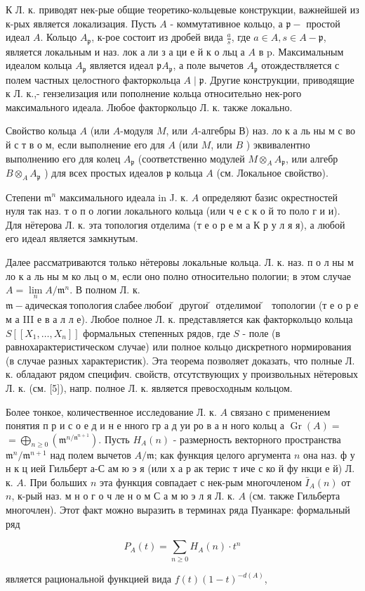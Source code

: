 \documentclass[10pt]{article}
\begin{document}
К Л. к. приводят нек-рые общие теоретико-кольцевые конструкции, важнейшей из к-рых является локализация. Пусть $A$ - коммутативное кольцо, а $\mathfrak{p}-$ простой идеал $A$. Кольцо $A_{\mathfrak{p}}$, к-рое состоит из дробей вида $\frac{a}{s}$, где $a \in A, s \in A-\mathfrak{p}$, является локальным и наз. лок а ли з а ци е й к о льц а $A$ в p. Максимальным идеалом кольца $A_{\mathfrak{p}}$ является идеал $\mathfrak{p} A_{\mathfrak{p}}$, а поле вычетов $A_{\mathfrak{p}}$ отождествляется с полем частных целостного факторкольца $A \mid \mathfrak{p}$. Другие конструкции, приводящие к Л. к.,- гензелизация или пополнение кольца относительно нек-рого максимального идеала. Любое факторкольцо Л. к. также локально.



Свойство кольца $A$ (или $A$-модуля $M$, или $A$-алгебры В) наз. ло к а ль ны м с во й с т в о м, если выполнение его для $A$ (или $M$, или $B$ ) эквивалентно выполнению его для колец $A_{\mathfrak{p}}$ (соответственно модулей $M \otimes_{A} A_{\mathfrak{p}}$, или алгебр $B \otimes_{A} A_{\mathfrak{p}}$ ) для всех простых идеалов $\mathfrak{p}$ кольца $A$ (см. Локальное свойство).



Степени $\mathfrak{m}^{n}$ максимального идеала in J. к. $A$ определяют базис окрестностей нуля так наз. т о п о логии локального кольца (или ч е с к о й то поло г и и). Для нётерова Л. к. эта топология отделима (т е о р е м а К р у л я я), а любой его идеал является замкнутым.



Далее рассматриваются только нётеровы локальные кольца. Л. к. наз. п о л ны м ло к а ль ны м ко льц о м, если оно полно относительно пологии; в этом случае $A=\underset{n}{\lim } A / \mathfrak{m}^{n}$. В полном Л. к. $\mathfrak{m - а д и ч е с к а я ~ т о п о л о г и я ~ с л а б е е ~ л ю б о и ̆ ~ д р у г о и ̆ ~ о т д е л и м о и ̆ ~}$ топологии (т е о р е м а III е в а л л е). Любое полное Л. к. представляется как факторкольцо кольца $S\left[\left[X_{1}, \ldots, X_{n}\right]\right]$ формальных степенных рядов, где $S$ - поле (в равнохарактеристическом случае) или полное кольцо дискретного нормирования (в случае разных характеристик). Эта теорема позволяет доказать, что полные Л. к. обладают рядом специфич. свойств, отсутствующих у произвольных нётеровых Л. к. (см. [5]), напр. полное Л. к. является превосходным кольцом.



Более тонкое, количественное исследование Л. к. $A$ связано с применением понятия п р и с о е д и н е нного гр а д уи ро в а н ного кольц а $\operatorname{Gr}(A)=$ $=\bigoplus_{n \geqslant 0}\left(\mathfrak{m}^{n / \mathfrak{n}^{n+1}}\right)$. Пусть $H_{A}(n)$ - размерность векторного пространства $\mathfrak{m}^{n} / \mathfrak{m}^{n+1}$ над полем вычетов $A / \mathfrak{m}$; как функция целого аргумента $n$ она наз. ф у н к ц ией Гильберт а-С ам ю э я (или х а р ак терис т иче с ко й фу нкци е й) Л. к. $A$. При больших $n$ эта функция совпадает с нек-рым многочленом $\bar{I}_{A}(n)$ от $n$, к-рый наз. м н о г о ч ле н о м С а м ю э л я Л. к. $A$ (см. также Гильберта многочлен). Этот факт можно выразить в терминах ряда Пуанкаре: формальный ряд



\[

P_{A}(t)=\sum_{n \geqslant 0} H_{A}(n) \cdot t^{n}

\]



является рациональной функцией вида $f(t)(1-t)^{-d(A)}$,
\end{document}
